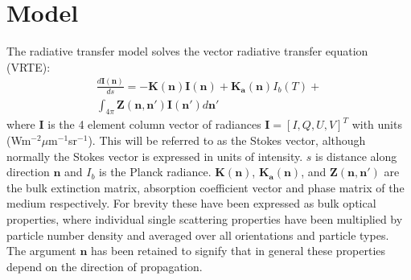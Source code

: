 \section{Model}
 \label{sec:montecarlo:model}
The radiative transfer model solves the vector
radiative transfer equation (VRTE):
\begin{eqnarray}
\frac{d\mathbf{I(n)}}{ds}=-\mathbf{K(n)I(n)} +
\mathbf{K_a(n)}I_b(T) +\nonumber\\
\int_{4\pi}\mathbf{Z(n,n')I(n')}d\mathbf{n'}
\label{vrte}
\end{eqnarray}
where $\mathbf{I}$ is the 4 element column vector of radiances
$\mathbf{I}=\left[I,Q,U,V\right]^T$ with units
(Wm$^{-2}\mu$m$^{-1}$sr$^{-1}$). This will be referred to as the
Stokes vector, although normally the Stokes vector is expressed in
units of intensity.  $s$ is distance along direction $\mathbf{n}$ and
$I_b$ is the Planck radiance. $\mathbf{K(n)}$, $\mathbf{K_a(n)}$,
and $\mathbf{Z(n,n')}$ are the bulk extinction matrix, absorption
coefficient vector and phase matrix of the medium respectively.  For
 brevity these have been expressed as bulk optical
properties, where individual single scattering properties have been
multiplied by particle number density and averaged over all
orientations and particle types. The argument $\mathbf{n}$ has been
retained to signify that in general these properties depend on the
direction of propagation. 

